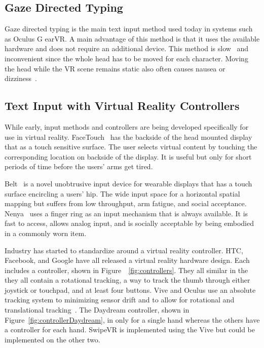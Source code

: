 \subsection{Gaze Directed Typing}
Gaze directed typing is the main text input method used today in systems such as Oculus G earVR. A main advantage of this method is that it uses the available hardware and does not require an additional device. This method is slow~\cite{card1983psychology, mackenzie1992fitts} and inconvenient since the whole head has to be moved for each character.
Moving the head while the VR scene remains static also often causes nausea or dizziness~\cite{atienza2016interaction}.   

\subsection{Text Input with Virtual Reality Controllers}
While early, input methods and controllers are being developed specifically for use in virtual reality.
FaceTouch~\cite{Gugenheimer:2016:FTI:2851581.2890242} has the backside of the head mounted display that as a touch sensitive surface.
The user selects virtual content by touching the corresponding location on backside of the display.
It is useful but only for short periods of time before the users' arms get tired.

Belt~\cite{dobbelstein2015belt} is a novel unobtrusive input device for wearable displays that has a touch surface encircling a users' hip.
The wide input space for a horizontal spatial mapping but suffers from low throughput, arm fatigue, and social acceptance.
Nenya~\cite{ashbrook2011nenya} uses a finger ring as an input mechanism that is always available.
It is fast to access, allows analog input, and is socially acceptable by being embodied in a commonly worn item.

Industry has started to standardize around a virtual reality controller.  HTC, Facebook, and Google have all released a virtual reality hardware design.
Each includes a controller, shown in Figure~~\ref{fig:controllers}.
They all similar in the they all contain a rotational tracking, a way to track the thumb through either joystick or touchpad, and at least four buttons.
Vive and Oculus use an absolute tracking system to minimizing sensor drift and to allow for rotational and translational tracking~\cite{hilfert2016low}.
The Daydream controller, shown in Figure~\ref{fig:controllerDaydream}, in only for a single hand whereas the others have a controller for each hand.
SwipeVR is implemented using the Vive but could be implemented on the other two.

